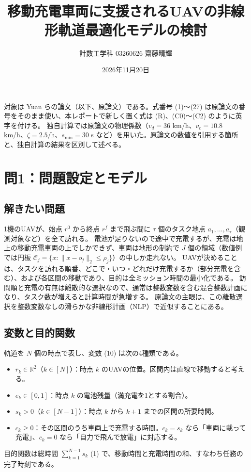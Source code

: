 \documentclass[uplatex,dvipdfmx,a4paper,11pt,jafont=haranoaji]{bxjsarticle}
\newcommand{\answerpart}[1]{\par\Needspace{6\baselineskip}\subsection*{#1}}
\newcommand{\norm}[1]{\lVert #1\rVert_2}
\begin{document}
\title{移動充電車両に支援されるUAVの非線形軌道最適化モデルの検討}
\author{計数工学科 03260626 齋藤晴輝}
\date{2026年11月20日}
\maketitle
\thispagestyle{fancy}

対象は Yuan ら\cite{yuan}の論文（以下、原論文）である。式番号 (1)〜(27) は原論文の番号をそのまま使い、本レポートで新しく置く式は (R)、(C0)〜(C2) のように英字を付ける。
独自計算では原論文の物理係数（$v_d=36$ km/h、$v_c=10.8$ km/h、$\zeta=2.5$/h、$s_{\min}=30$ s など）を用いた。原論文の数値を引用する箇所と、独自計算の結果を区別して述べる。

\section{問1：問題設定とモデル}

\answerpart{解きたい問題}
1機のUAVが、始点 $r^0$ から終点 $r^f$ まで飛ぶ間に $\tau$ 個のタスク地点 $a_1,\dots,a_\tau$（観測対象など）を全て訪れる。
電池が足りないので途中で充電するが、充電は地上の移動充電車両の上でしかできず、車両は地形の制約で $J$ 個の領域（数値例では円板 $\mathcal C_j=\{x:\norm{x-o_j}\le\rho_j\}$）の中しか走れない。
UAVが決めることは、タスクを訪れる順番、どこで・いつ・どれだけ充電するか（部分充電を含む）、および各区間の移動であり、目的は全ミッション時間の最小化である。
訪問順と充電の有無は離散的な選択なので、通常は整数変数を含む混合整数計画になり、タスク数が増えると計算時間が急増する。
原論文の主眼は、この離散選択を整数変数なしの滑らかな非線形計画（NLP）で近似することにある。

\answerpart{変数と目的関数}
軌道を $N$ 個の時点で表し、変数 (10) は次の4種類である。
\begin{itemize}
  \item $r_k\in\mathbb R^2$（$k\in[N]$）：時点 $k$ のUAVの位置。区間内は直線で移動すると考える。
  \item $e_k\in[0,1]$：時点 $k$ の電池残量（満充電を1とする割合）。
  \item $s_k>0$（$k\in[N-1]$）：時点 $k$ から $k+1$ までの区間の所要時間。
  \item $c_k\ge0$：その区間のうち車両上で充電する時間。$c_k=s_k$ なら「車両に載って充電」、$c_k=0$ なら「自力で飛んで放電」に対応する。
\end{itemize}
目的関数は総時間 $\sum_{k=1}^{N-1}s_k$ (1) で、移動時間と充電時間の和、すなわち任務の完了時刻である。
\end{document}
